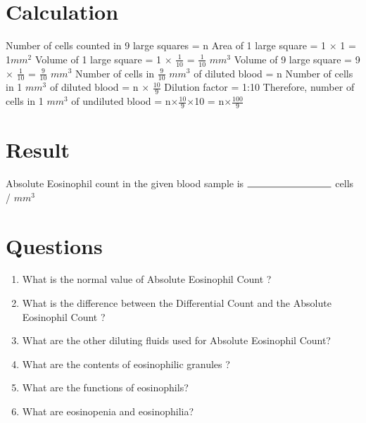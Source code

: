 \documentclass[a4paper,12pt,openany,oneside]{book}
\begin{document}
					\section*{Calculation}
					Number of cells counted in 9 large squares				=	n\newline\vspace{.2cm}
					Area of 1 large square				=	1 $\times$ 1		=	1$mm^2$	\newline\vspace{.2cm}
					Volume of 1 large square				=	1 $\times$ $\frac{1}{10}$	=	$\frac{1}{10}$ $mm^3$\newline\vspace{.2cm}
					Volume of 9 large square				=	9 $\times$ $\frac{1}{10}$	=	$\frac{9}{10}$ $mm^3$\newline\vspace{.2cm}
					Number of cells in $\frac{9}{10}$ $mm^3$ of diluted blood				=	n\newline\vspace{.2cm}
					Number of cells in 1 $mm^3$ of diluted blood				=	n $\times$ $\frac{10}{9}$\newline\vspace{.2cm}
					Dilution factor								=	1:10\newline\vspace{.2cm}
					Therefore, number of cells in 1 $mm^3$ of undiluted blood		=	n$\times$$\frac{10}{9}$$\times$10
					=	n$\times$$\frac{100}{9}$
					\section*{Result}

					Absolute Eosinophil count in the given  blood sample is $\rule{3cm}{0.5pt}$ cells / $mm^3$

					\section*{Questions}
					\begin{enumerate}

						\item{What is the normal value of Absolute Eosinophil Count ?}
						\item{What is the difference between the Differential Count and the Absolute Eosinophil Count ?}
						\item{What are the other diluting fluids used for Absolute Eosinophil Count?}
						\item{What are the contents of eosinophilic granules ?}
						\item{What are the functions of eosinophils?}
						\item{What are eosinopenia and eosinophilia?}
					\end{enumerate}
\end{document}
